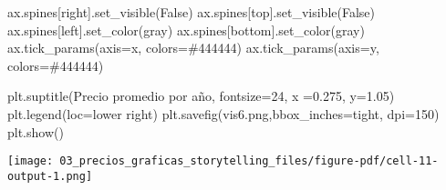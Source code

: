 \documentclass[
  letterpaper,
  DIV=11,
  numbers=noendperiod]{scrreprt}
\newenvironment{Shaded}{\begin{snugshade}}{\end{snugshade}}
\newcommand{\DecValTok}[1]{\textcolor[rgb]{0.68,0.00,0.00}{#1}}
\newcommand{\FloatTok}[1]{\textcolor[rgb]{0.68,0.00,0.00}{#1}}
\newcommand{\NormalTok}[1]{\textcolor[rgb]{0.00,0.23,0.31}{#1}}
\newcommand{\OperatorTok}[1]{\textcolor[rgb]{0.37,0.37,0.37}{#1}}
\newcommand{\StringTok}[1]{\textcolor[rgb]{0.13,0.47,0.30}{#1}}
\newcommand{\VariableTok}[1]{\textcolor[rgb]{0.07,0.07,0.07}{#1}}
\begin{document}
\begin{Shaded}
\begin{Highlighting}[]
\NormalTok{ax.spines[}\StringTok{\textquotesingle{}right\textquotesingle{}}\NormalTok{].set\_visible(}\VariableTok{False}\NormalTok{)}
\NormalTok{ax.spines[}\StringTok{\textquotesingle{}top\textquotesingle{}}\NormalTok{].set\_visible(}\VariableTok{False}\NormalTok{)}
\NormalTok{ax.spines[}\StringTok{\textquotesingle{}left\textquotesingle{}}\NormalTok{].set\_color(}\StringTok{\textquotesingle{}gray\textquotesingle{}}\NormalTok{)}
\NormalTok{ax.spines[}\StringTok{\textquotesingle{}bottom\textquotesingle{}}\NormalTok{].set\_color(}\StringTok{\textquotesingle{}gray\textquotesingle{}}\NormalTok{)}
\NormalTok{ax.tick\_params(axis}\OperatorTok{=}\StringTok{\textquotesingle{}x\textquotesingle{}}\NormalTok{, colors}\OperatorTok{=}\StringTok{\textquotesingle{}\#444444\textquotesingle{}}\NormalTok{)}
\NormalTok{ax.tick\_params(axis}\OperatorTok{=}\StringTok{\textquotesingle{}y\textquotesingle{}}\NormalTok{, colors}\OperatorTok{=}\StringTok{\textquotesingle{}\#444444\textquotesingle{}}\NormalTok{)}

\NormalTok{plt.suptitle(}\StringTok{\textquotesingle{}Precio promedio por año\textquotesingle{}}\NormalTok{, fontsize}\OperatorTok{=}\DecValTok{24}\NormalTok{, x }\OperatorTok{=}\FloatTok{0.275}\NormalTok{, y}\OperatorTok{=}\FloatTok{1.05}\NormalTok{)}
\NormalTok{plt.legend(loc}\OperatorTok{=}\StringTok{\textquotesingle{}lower right\textquotesingle{}}\NormalTok{)}
\NormalTok{plt.savefig(}\StringTok{\textquotesingle{}vis6.png\textquotesingle{}}\NormalTok{,bbox\_inches}\OperatorTok{=}\StringTok{\textquotesingle{}tight\textquotesingle{}}\NormalTok{, dpi}\OperatorTok{=}\DecValTok{150}\NormalTok{)}
\NormalTok{plt.show()}
\end{Highlighting}
\end{Shaded}

\texttt{[image: 03\_precios\_graficas\_storytelling\_files/figure-pdf/cell-11-output-1.png]}
\end{document}
